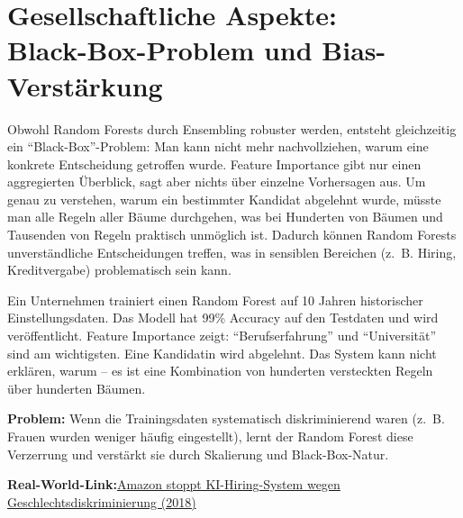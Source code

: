 \section[Gesellschaftliche Aspekte: Black-Box-Problem und Bias-Verstärkung]{Gesellschaftliche Aspekte:\\ Black-Box-Problem und Bias-Verstärkung}

\begin{mydefinition}
    Obwohl Random Forests durch Ensembling robuster werden, entsteht gleichzeitig ein \enquote{Black-Box}-Problem: Man kann nicht mehr nachvollziehen, warum eine konkrete Entscheidung getroffen wurde. Feature Importance gibt nur einen aggregierten Überblick, sagt aber nichts über einzelne Vorhersagen aus. Um genau zu verstehen, warum ein bestimmter Kandidat abgelehnt wurde, müsste man alle Regeln aller Bäume durchgehen, was bei Hunderten von Bäumen und Tausenden von Regeln praktisch unmöglich ist. Dadurch können Random Forests unverständliche Entscheidungen treffen, was in sensiblen Bereichen (z.~B. Hiring, Kreditvergabe) problematisch sein kann.
\end{mydefinition}

\begin{myexample}
    Ein Unternehmen trainiert einen Random Forest auf 10 Jahren historischer Einstellungsdaten. Das Modell hat 99\% Accuracy auf den Testdaten und wird veröffentlicht. Feature Importance zeigt: \enquote{Berufserfahrung} und \enquote{Universität} sind am wichtigsten. Eine Kandidatin wird abgelehnt. Das System kann nicht erklären, warum -- es ist eine Kombination von hunderten versteckten Regeln über hunderten Bäumen.

    \textbf{Problem:} Wenn die Trainingsdaten systematisch diskriminierend waren (z.~B. Frauen wurden weniger häufig eingestellt), lernt der Random Forest diese Verzerrung und verstärkt sie durch Skalierung und Black-Box-Natur.

    \textbf{Real-World-Link:}\newline \href{https://www.reuters.com/article/world/insight-amazon-scraps-secret-ai-recruiting-tool-that-showed-bias-against-women-idUSKCN1MK0AG/}{Amazon stoppt KI-Hiring-System wegen Geschlechtsdiskriminierung (2018)}
\end{myexample}

